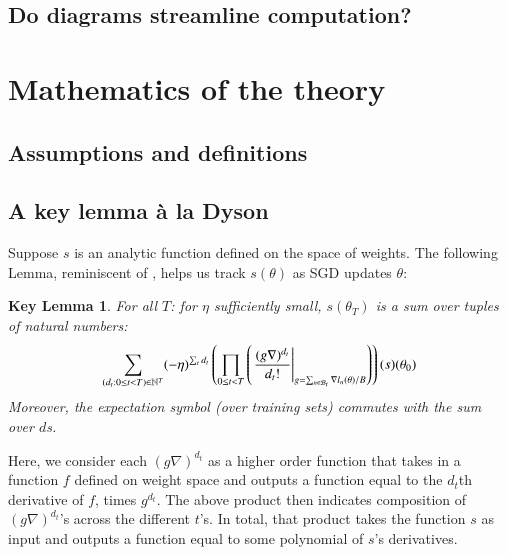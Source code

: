 \documentclass{article}
\theoremstyle{plain}
\newtheorem*{klem*}{Key Lemma}
\theoremstyle{definition}
\newcommand{\wrap}[1]{\left(#1\right)}
\newcommand{\Bb}{\mathcal{B}}
\begin{document}
    \subsection{Do diagrams streamline computation?}                \label{appendix:diagrams-streamline}


\newpage
\section{Mathematics of the theory}\label{appendix:math}
    \subsection{Assumptions and definitions}                        \label{appendix:assumptions}

    \subsection{A key lemma \`a la Dyson}                           \label{appendix:key-lemma}

        Suppose $s$ is an analytic function defined on the space of weights.
        The following Lemma, reminiscent of \cite{dy49a}, helps us track
        $s(\theta)$ as SGD updates $\theta$:
        \begin{klem*} \label{lem:dyson}
            For all $T$: for $\eta$ sufficiently small, $s(\theta_T)$ is a sum
            over tuples of natural numbers:
            \begin{equation}\label{eq:dyson}
                \sum_{(d_t: 0\leq t<T) \in \NN^T}
                (-\eta)^{\sum_t d_t}
                \wrap{
                    \prod_{0 \leq t < T}
                        \wrap{\left.
                            \frac{(g \nabla)^{d_t}}{d_t!}
                        \right|_{g = \sum_{n\in \Bb_t} \nabla l_n(\theta) / B}}
                }(s) (\theta_0)
            \end{equation}
            Moreover, the expectation symbol (over training sets) commutes with
            the sum over $d$s.
        \end{klem*}
        Here, we consider each $(g \nabla)^{d_t}$ as a higher order function
        that takes in a function $f$ defined on weight space and outputs a
        function equal to the $d_t$th derivative of $f$, times $g^{d_t}$.
        The above product then indicates composition of $(g \nabla)^{d_t}$'s
        across the different $t$'s.  In total, that product takes the function
        $s$ as input and outputs a function equal to some polynomial of $s$'s
        derivatives.
\end{document}
